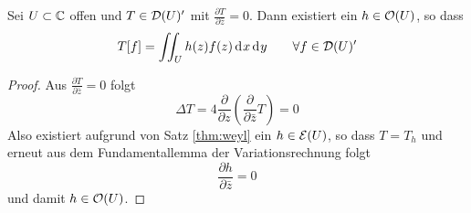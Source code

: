 \begin{cor}
  \label{cor:hol-dist}
  Sei $U \subset \mathbb{C}$ offen und $T \in \mathcal{D}(U)'$ mit $\frac{\partial
    T}{\partial \bar z} = 0$. 
  Dann existiert ein $h \in \mathcal{O}(U)$, so dass
  \[
  T[f] = \iint_U h(z)f(z) \d[x]\d[y] \qquad \forall f \in \dist(U)'
  \]
\end{cor}

\begin{proof}
  Aus $\frac{\partial T}{\partial \bar z} = 0$ folgt
  \[
  \Delta T  = 4 \frac{\partial}{\partial z} \left (
    \frac{\partial}{\partial \bar z} T \right ) = 0
  \]
  Also existiert aufgrund von Satz \ref{thm:weyl} ein $h \in
  \mathcal{E}(U)$, so dass $T = T_h$ und erneut aus dem Fundamentallemma der
  Variationsrechnung folgt
  \[
  \frac{\partial h}{\partial \bar z} = 0
  \]
  und damit $h \in \mathcal{O}(U)$.
\end{proof}



